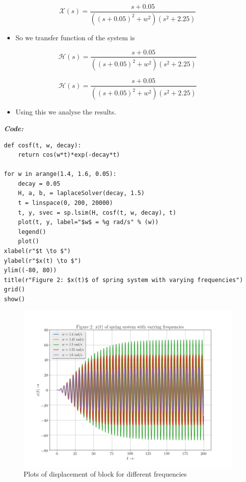 \documentclass[11pt, a4paper]{article}
\begin{document}
    \begin{equation}
        \mathcal{X}(s) = \frac{s+0.05}{((s+0.05)^2 + w^2)(s^2 + 2.25)}
    \end{equation}
    
    \begin{itemize}
    
    \item
      So we transfer function of the system is
    \end{itemize}
    
    \begin{equation}
        \mathcal{H}(s) = \frac{s+0.05}{((s+0.05)^2 + w^2)(s^2 + 2.25)}
    \end{equation}
    
    \begin{equation}
        \mathcal{H}(s) = \frac{s+0.05}{((s+0.05)^2 + w^2)(s^2 + 2.25)}
    \end{equation}
    
    \begin{itemize}
    
    \item
      Using this we analyse the results.
    \end{itemize}
    \textit{\textbf{Code:}}
   \begin{lstlisting}
def cosf(t, w, decay):
    return cos(w*t)*exp(-decay*t)

for w in arange(1.4, 1.6, 0.05):
    decay = 0.05
    H, a, b, = laplaceSolver(decay, 1.5)
    t = linspace(0, 200, 20000)
    t, y, svec = sp.lsim(H, cosf(t, w, decay), t)
    plot(t, y, label="$w$ = %g rad/s" % (w))
    legend()
    plot()
xlabel(r"$t \to $")
ylabel(r"$x(t) \to $")
ylim((-80, 80))
title(r"Figure 2: $x(t)$ of spring system with varying frequencies")
grid()
show()
   \end{lstlisting}
   \newpage
   \begin{figure}[!tbh]
    \centering
    \includegraphics[scale=0.5]{./../Extras/A62.png}  %
        \caption{Plots of displacement of block for different frequencies}
  \end{figure}
  \newpage
\end{document}
